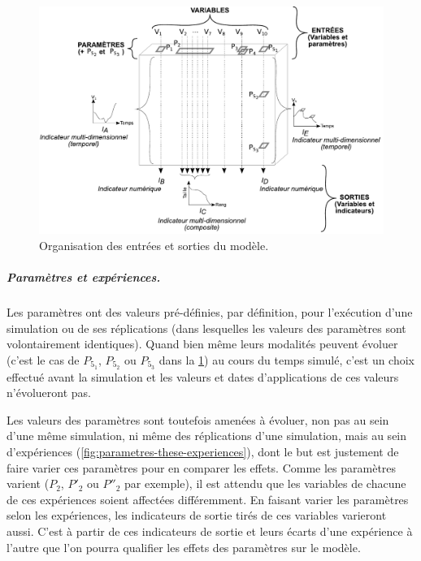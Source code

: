 \begin{figure}[H]
	\includegraphics[width=\linewidth]{img/schemas_params_3_complet.pdf}
	\caption{Organisation des entrées et sorties du modèle.} 
	\label{fig:parametres-these-complet} 
\end{figure}

\subparagraph{Paramètres et expériences.}
Les paramètres ont des valeurs pré-définies, par définition, pour l'exécution d'une simulation ou de ses réplications (dans lesquelles les valeurs des paramètres sont volontairement identiques).
Quand bien même leurs modalités peuvent évoluer (c'est le cas de $P_{5_{1}}$, $P_{5_{2}}$ ou $P_{5_{3}}$ dans la \cref{fig:parametres-these-complet}) au cours du temps simulé, c'est un choix effectué avant la simulation et les valeurs et dates d'applications de ces valeurs n'évolueront pas.

Les valeurs des paramètres sont toutefois amenées à évoluer, non pas au sein d'une même simulation, ni même des réplications d'une simulation, mais au sein d'expériences (\cref{fig:parametres-these-experiences}), dont le but est justement de faire varier ces paramètres pour en comparer les effets.
Comme les paramètres varient ($P_2$, $P'_2$ ou $P''_2$ par exemple), il est attendu que les variables de chacune de ces expériences soient affectées différemment.
En faisant varier les paramètres selon les expériences, les indicateurs de sortie tirés de ces variables varieront aussi.
C'est à partir de ces indicateurs de sortie et leurs écarts d'une expérience à l'autre que l'on pourra qualifier les effets des paramètres sur le modèle.


